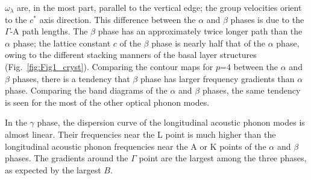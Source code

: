 \documentclass[twocolumn,amsmath,amssymb,a4paper,prb,superscriptaddress,floatfix]{revtex4-1}
\begin{document}
\noindent
$\omega_\lambda$ are, in the most part, parallel to the vertical edge; the
group velocities orient to the $c^*$ axis direction.
This difference between the $\alpha$ and $\beta$ phases is
due to the $\Gamma$-A path lengths. The $\beta$ phase has an approximately twice
longer path than the $\alpha$ phase; the lattice constant $c$ of the $\beta$
phase is nearly half that of the $\alpha$ phase, owing to the different stacking
manners of the basal layer structures (Fig.~\ref{fig:Fig1_cryst}). 
Comparing the contour maps for $p$=4 between the $\alpha$ and $\beta$ phases, there is a
tendency that $\beta$ phase has larger frequency gradients than $\alpha$ phase.
Comparing the band diagrams of the $\alpha$ and $\beta$ phases, the same
tendency is seen for the most of the other optical phonon modes.

In the $\gamma$ phase, the dispersion curve of the longitudinal acoustic phonon
modes is almost linear. Their frequencies near the L point is much higher
than the longitudinal acoustic phonon frequencies near the A or K points of the
$\alpha$ and $\beta$ phases.  The gradients around the $\Gamma$ point are
the largest among the three phases, as expected by the largest $B$.

\onecolumngrid
\end{document}
